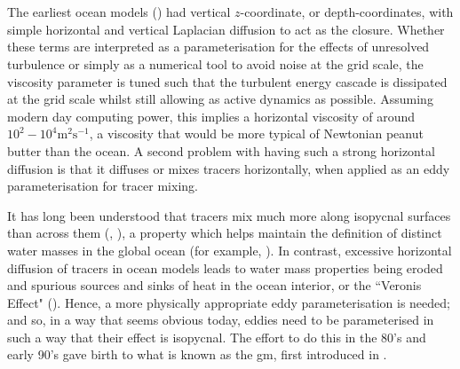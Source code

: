 \documentclass[12pt,a4paper]{report}
\begin{document}
 \section{\cite{gent1990}}
 
 The earliest ocean models (\cite{bryan1969numerical}) had vertical $z$-coordinate, or depth-coordinates, with simple horizontal and vertical Laplacian diffusion to act as 
 the closure. Whether these terms are interpreted as a parameterisation for the effects
 of unresolved turbulence or simply as a numerical tool to avoid noise at 
 the grid scale, the viscosity parameter is tuned such that the turbulent energy cascade is 
 dissipated at the grid scale whilst still allowing as active dynamics as possible. 
 Assuming modern day computing power, this implies a horizontal viscosity of around 
 $10^{2} - 10^{4} \mathrm{m^{2}s^{-1}} $, a viscosity that would be more typical of 
 Newtonian peanut butter than 
 the ocean. A second problem with having such a strong horizontal diffusion is
 that it diffuses or mixes tracers horizontally, when applied as
 an eddy parameterisation for tracer mixing. 
 
 It has long been understood that tracers 
 mix much more along isopycnal surfaces than across them (\cite{iselin1939influence}, \cite{montgomery1940present}),  a property which helps maintain the definition of
 distinct water masses in the global ocean (for example, \cite{emery1986global}).
  In contrast, excessive horizontal diffusion
 of tracers in ocean models leads to water mass properties
 being eroded and spurious sources and sinks of heat in the 
 ocean interior, or the ``Veronis Effect" (\cite{veronis1975role}).
 Hence, a more physically appropriate eddy parameterisation 
 is needed;
  and so, in a way that seems obvious today, eddies need to be
   parameterised in 
 such a way that their effect is isopycnal. 
 The effort to do this in the 80's and early 90's gave birth
 to what is known as the \gls{gm}, first introduced in \cite{gent1990}.
 
\end{document}
